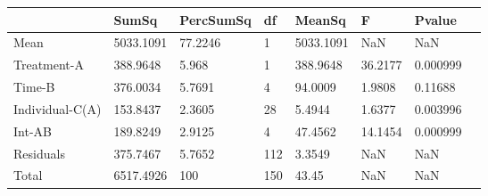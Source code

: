 \begin{table} 
\begin{tabular}{llllllll}
 & SumSq & PercSumSq & df & MeanSq & F & Pvalue \\ 
 \hline 
Mean & 5033.1091 & 77.2246 & 1 & 5033.1091 & NaN & NaN \\ 
Treatment-A & 388.9648 & 5.968 & 1 & 388.9648 & 36.2177 & 0.000999 \\ 
Time-B & 376.0034 & 5.7691 & 4 & 94.0009 & 1.9808 & 0.11688 \\ 
Individual-C(A) & 153.8437 & 2.3605 & 28 & 5.4944 & 1.6377 & 0.003996 \\ 
Int-AB & 189.8249 & 2.9125 & 4 & 47.4562 & 14.1454 & 0.000999 \\ 
Residuals & 375.7467 & 5.7652 & 112 & 3.3549 & NaN & NaN \\ 
Total & 6517.4926 & 100 & 150 & 43.45 & NaN & NaN \\ 
\end{tabular} 
\end{table} 
